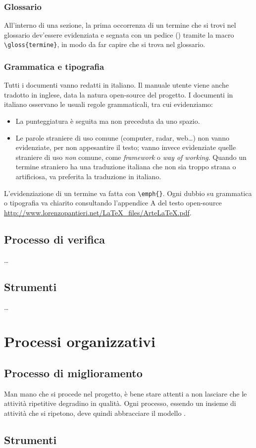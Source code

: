\subsubsection{Glossario} All'interno di una sezione, la prima occorrenza di un termine che si trovi nel glossario dev'essere evidenziata e segnata con un pedice () tramite la macro \texttt{\textbackslash gloss\{termine\}}, in modo da far capire che si trova nel glossario.

\subsubsection{Grammatica e tipografia} Tutti i documenti vanno redatti in italiano. Il manuale utente viene anche tradotto in inglese, data la natura open-source del progetto. I documenti in italiano osservano le usuali regole grammaticali, tra cui evidenziamo:
\begin{itemize}
	\item La punteggiatura è seguita ma non preceduta da uno spazio.
	\item Le parole straniere di uso comune (computer, radar, web\dots) non vanno evidenziate, per non appesantire il testo; vanno invece evidenziate quelle straniere di uso \emph{non} comune, come \emph{framework} o \emph{way of working}. Quando un termine straniero ha una traduzione italiana che non sia troppo strana o artificiosa, va preferita la traduzione in italiano.
\end{itemize}
L'evidenziazione di un termine va fatta con \texttt{\textbackslash emph\{\}}. Ogni dubbio su grammatica o tipografia va chiarito consultando l'appendice A del testo open-source \url{http://www.lorenzopantieri.net/LaTeX_files/ArteLaTeX.pdf}.



\subsection{Processo di verifica} \dots

\subsection{Strumenti} \dots

\section{Processi organizzativi}

\subsection{Processo di miglioramento} %
Man mano che si procede nel progetto, è bene stare attenti a non lasciare che le attività ripetitive degradino in qualità. Ogni processo, essendo un insieme di attività che si ripetono, deve quindi abbracciare il modello . %

\subsection{Strumenti}


